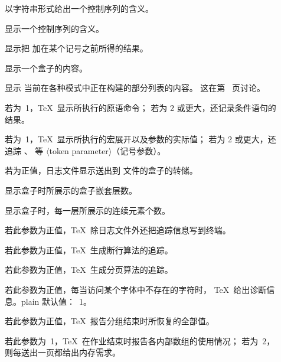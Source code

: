 \documentclass[a4paper]{rapport3}
\makeatletter
\def\gr#1{$\langle$#1$\rangle$}\def\key#1{{\tt#1}}
\newenvironment{inventory}{\begin{description}}{\end{description}}
\def\cstoidx#1\par{\index{#1@\cs{#1}}}
\def\csidx#1{\cstoidx #1\par\cs{#1}}
\makeatother
\begin{document}
\begin{inventory}
\item [] 
      以字符串形式给出一个控制序列的含义。

\item [] 
      显示一个控制序列的含义。

\item [] 
      显示把  加在某个记号之前所得的结果。

\item [] 
      显示一个盒子的内容。

\item [] 
      显示
      当前在各种模式中正在构建的部分列表的内容。
      这在第~\pageref{showlists} 页讨论。

\item [\csidx{tracingcommands}]
      若为~1，\TeX\ 显示所执行的原语命令；
      若为 2 或更大，还记录条件语句的结果。

\item [\csidx{tracingmacros}] 
      若为~1，\TeX\ 显示所执行的宏展开以及参数的实际值；
      若为 2 或更大，还追踪 、 等 \gr{token parameter}（记号参数）。

\item [] 
      若为正值，日志文件显示送出到  文件的盒子的转储。

\item []  
      显示盒子时所展示的盒子嵌套层数。

\item [] 
      显示盒子时，每一层所展示的连续元素个数。

\item [\csidx{tracingonline}] 
      若此参数为正值，\TeX\ 除日志文件外还把追踪信息写到终端。

\item [] 
      若此参数为正值，\TeX\ 生成断行算法的追踪。

\item [\csidx{tracingpages}] 
      若此参数为正值，\TeX\ 生成分页算法的追踪。

\item [\csidx{tracinglostchars}] 
      若此参数为正值，每当访问某个字体中不存在的字符时，
      \TeX\ 给出诊断信息。plain 默认值：~1。

\item [\csidx{tracingrestores}] 
      若此参数为正值，\TeX\ 报告分组结束时所恢复的全部值。

\item [] 
      若此参数为~1，\TeX\ 在作业结束时报告各内部数组的使用情况；
      若为~2，则每送出一页都给出内存需求。

\end{inventory}
\end{document}
